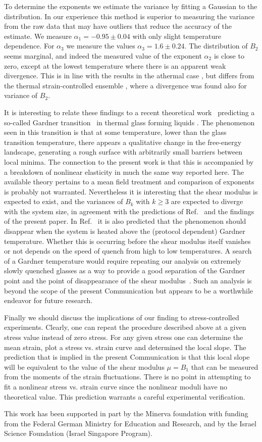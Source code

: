 \documentclass[pre,twocolumn,aps,10pt,superscriptaddress,notitlepage,nofootinbib]{revtex4-1}
\begin{document}
To determine the exponents we estimate the variance by fitting a Gaussian to the distribution. In our experience
this method is superior to measuring the variance from the raw data that may have outliers that reduce the
accuracy of the estimate.  We measure $\alpha_1 =-0.95\pm0.04$ with only slight temperature dependence.
For $\alpha_3$ we measure the values $\alpha_3=1.6\pm 0.24$.
The distribution of $B_2$ seems marginal, and indeed the measured value of the exponent $\alpha_2$ is close
to zero, except at the lowest temperature where there is an apparent weak divergence.
 This is in line with the results in the athermal case \cite{HentschelKarmakar11}, but differs from the thermal strain-controlled ensemble \cite{PRSS16}, where a divergence was found also for variance of $B_2$.

It is interesting to relate these findings to a recent theoretical work~\cite{16BU} predicting a so-called Gardner transition~\cite{Ga85} in
thermal glass forming liquids \cite{fullRSB,16BU}. The phenomenon seen in this transition is that at some temperature, lower than the glass transition temperature, there appears a qualitative change in the free-energy
landscape, generating a rough surface with arbitrarily small barriers between local minima. The connection to the
present work is that this is accompanied by a breakdown of nonlinear elasticity in much the same
way reported here. The available theory pertains to a mean field treatment and comparison of exponents is
probably not warranted. Nevertheless it is interesting that the shear modulus is expected to exist, and the
variances of $B_k$ with $k\ge 3$ are expected to diverge with the system size, in agreement with the predictions
of Ref.~\cite{HentschelKarmakar11} and the findings of the present paper.  In Ref.~\cite{16BU} it is also predicted that the phenomenon should disappear when the system is heated above the (protocol dependent) Gardner temperature. Whether this is occurring before the shear modulus itself vanishes or not depends on the
speed of quench from high to low temperatures. A search of a Gardner temperature
would require repeating our analysis on extremely slowly quenched glasses as a way to provide a good separation
of the Gardner point and the point of disappearance of the shear modulus~\cite{16BU}. Such an analysis is beyond the scope of the present Communication but appears to be a worthwhile endeavor for future research.

Finally we should discuss the implications of our finding to stress-controlled experiments. Clearly, one can
repeat the procedure described above at a given stress value instead of zero stress. For any given stress
one can determine the mean strain, plot a stress vs. strain curve and determined the local slope.
The prediction that is implied in the present Communication is that this local slope will be
equivalent to the value of the shear modulus $\mu=B_1$ that can be measured from the moments of the strain fluctuations. There is no point in attempting to fit a nonlinear stress vs. strain curve since
the nonlinear moduli have no theoretical value. This prediction warrants a careful experimental
verification.

\acknowledgments

This work has been supported in part  by the Minerva foundation with funding from the Federal German Ministry for Education and Research, and by the Israel Science Foundation (Israel Singapore Program).




\end{document}
